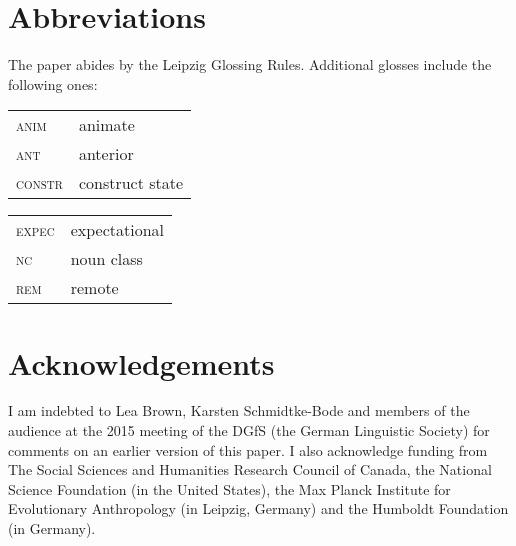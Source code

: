 \documentclass[output=paper]{langsci/langscibook}
\begin{document}
\section{Abbreviations}

The paper abides by the Leipzig Glossing Rules. Additional glosses include the following ones:


\begin{tabularx}{.45\textwidth}{lQ}
\textsc{anim}  &animate \\
\textsc{ant}  &anterior\\
\textsc{constr} & construct state\\
\end{tabularx}
\begin{tabularx}{.45\textwidth}{lQ}
\textsc{expec} & expectational\\
\textsc{nc} & noun class\\
\textsc{rem}  &remote\\
\end{tabularx}



\section{Acknowledgements}

I am indebted to Lea Brown, Karsten Schmidtke-Bode and members of the audience at the 2015 meeting of the DGfS (the German Linguistic Society) for comments on an earlier version of this paper. I also acknowledge funding from The Social Sciences and Humanities Research Council of Canada, the National Science Foundation (in the United States), the Max Planck Institute for Evolutionary Anthropology (in Leipzig, Germany) and the Humboldt Foundation (in Germany).


\sloppy
\printbibliography[heading=subbibliography,notkeyword=this] 
\end{document}
